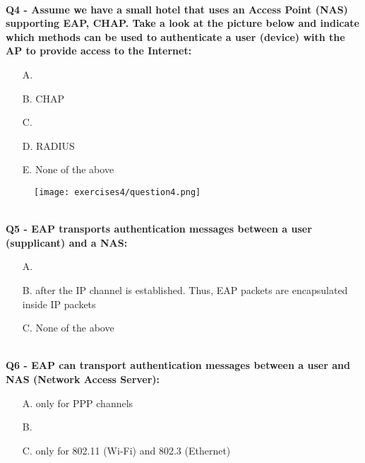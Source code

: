 \textbf{\\Q4 - Assume we have a small hotel that uses an Access Point (NAS) supporting EAP, CHAP. Take a look at the picture below and indicate which methods can be used to authenticate a user (device) with the AP to provide access to the Internet:}
\begin{itemize}
    \item[A.] 
    \item[B.] CHAP
    \item[C.] 
    \item[D.] RADIUS
    \item[E.] None of the above
\end{itemize}
\begin{figure}[h]
    \centering
    \texttt{[image: exercises4/question4.png]}
\end{figure}

\textbf{\\Q5 - EAP transports authentication messages between a user (supplicant) and a NAS:}
\begin{itemize}
    \item[A.] 
    \item[B.] after the IP channel is established. Thus, EAP packets are encapsulated inside IP packets
    \item[C.] None of the above
\end{itemize}

\textbf{\\Q6 - EAP can transport authentication messages between a user and NAS (Network Access Server):}
\begin{itemize}
    \item[A.] only for PPP channels
    \item[B.] 
    \item[C.] only for 802.11 (Wi-Fi) and 802.3 (Ethernet)
\end{itemize}
\com{}



